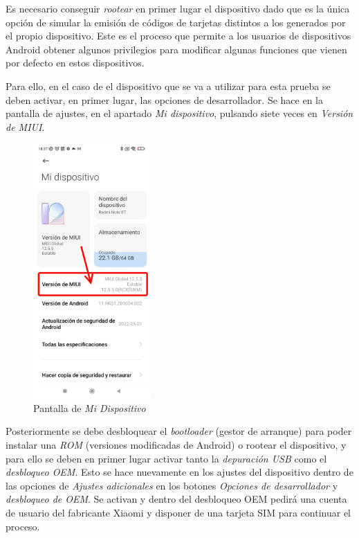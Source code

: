 \documentclass[12pt,a4paper,onecolumn,oneside]{report}
\begin{document}
Es necesario conseguir \textit{rootear} en primer lugar el dispositivo dado que es la única opción de simular la emisión de códigos de tarjetas distintos a los generados por el propio dispositivo. Este es el proceso que permite a los usuarios de dispositivos Android obtener algunos privilegios para modificar algunas funciones que vienen por defecto en estos dispositivos.

Para ello, en el caso de el dispositivo que se va a utilizar para esta prueba se deben activar, en primer lugar, las opciones de desarrollador. Se hace en la pantalla de ajustes, en el apartado \textit{Mi dispositivo}, pulsando siete veces en \textit{Versión de MIUI}.


\begin{figure}[h] 
\centering
  \includegraphics[width=0.4\textwidth]{figuras/root1.png}
  \caption[Pantalla de \textit{Mi Dispositivo}]{Pantalla de \textit{Mi Dispositivo}\\
  }
  \label{fig:root1}
\end{figure}

Posteriormente se debe desbloquear el \textit{bootloader} (gestor de arranque) para poder instalar una \textit{ROM} (versiones modificadas de Android) o rootear el dispositivo, y para ello se deben en primer lugar activar tanto la \textit{depuración USB} como el \textit{desbloqueo OEM}. Esto se hace nuevamente en los ajustes del dispositivo dentro de las opciones de \textit{Ajustes adicionales} en los botones \textit{Opciones de desarrollador} y \textit{desbloqueo de OEM}. Se activan y dentro del desbloqueo OEM pedirá una cuenta de usuario del fabricante Xiaomi y disponer de una tarjeta SIM para continuar el proceso.
\end{document}
